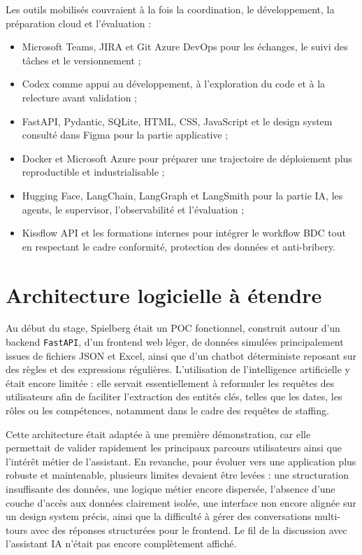 \documentclass[a4paper,11pt,english,openany]{book}
\begin{document}
Les outils mobilisés couvraient à la fois la coordination, le développement, la préparation cloud et l'évaluation :
\begin{itemize}
    \item Microsoft Teams, JIRA et Git Azure DevOps pour les échanges, le suivi des tâches et le versionnement ;
    \item Codex comme appui au développement, à l'exploration du code et à la relecture avant validation ;
    \item FastAPI, Pydantic, SQLite, HTML, CSS, JavaScript et le design system consulté dans Figma pour la partie applicative ;
    \item Docker et Microsoft Azure pour préparer une trajectoire de déploiement plus reproductible et industrialisable ;
    \item Hugging Face, LangChain, LangGraph et LangSmith pour la partie IA, les agents, le supervisor, l'observabilité et l'évaluation ;
    \item Kissflow API et les formations internes pour intégrer le workflow BDC tout en respectant le cadre conformité, protection des données et anti-bribery.
\end{itemize}

\section{Architecture logicielle à étendre}

Au début du stage, Spielberg était un POC fonctionnel, construit autour d'un backend \texttt{FastAPI}, d'un frontend web léger, de données simulées principalement issues de fichiers JSON et Excel, ainsi que d'un chatbot déterministe reposant sur des règles et des expressions régulières. L'utilisation de l'intelligence artificielle y était encore limitée : elle servait essentiellement à reformuler les requêtes des utilisateurs afin de faciliter l'extraction des entités clés, telles que les dates, les rôles ou les compétences, notamment dans le cadre des requêtes de staffing. 

Cette architecture était adaptée à une première démonstration, car elle permettait de valider rapidement les principaux parcours utilisateurs ainsi que l'intérêt métier de l'assistant. En revanche, pour évoluer vers une application plus robuste et maintenable, plusieurs limites devaient être levées : une structuration insuffisante des données, une logique métier encore dispersée, l'absence d'une couche d'accès aux données clairement isolée, une interface non encore alignée sur un design system précis, ainsi que la difficulté à gérer des conversations multi-tours avec des réponses structurées pour le frontend. Le fil de la discussion avec l'assistant IA n'était pas encore complètement affiché.
\end{document}
